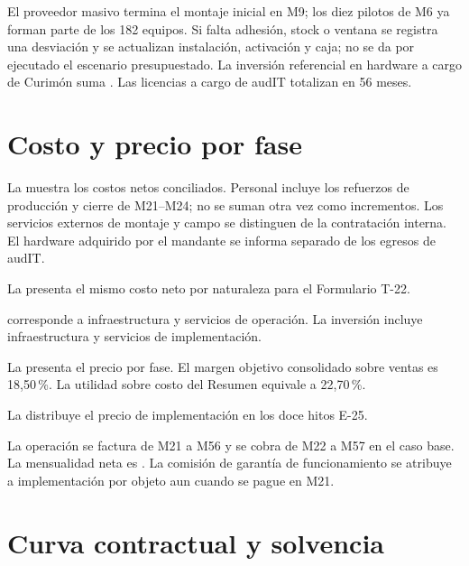 El proveedor masivo termina el montaje inicial en M9; los diez pilotos de M6 ya forman parte de
los 182 equipos. Si falta adhesión, stock o ventana se registra una desviación y se actualizan
instalación, activación y caja; no se da por ejecutado el escenario presupuestado.
La inversión referencial en hardware a cargo de Curimón suma .
Las licencias a cargo de audIT totalizan  en 56 meses.

\section{Costo y precio por fase}\label{sec:eco-costos}

La  muestra los costos netos conciliados. Personal incluye los refuerzos de
producción y cierre de M21--M24; no se suman otra vez como incrementos. Los servicios externos
de montaje y campo se distinguen de la contratación interna. El hardware adquirido por el
mandante se informa separado de los egresos de audIT.


La  presenta el mismo costo neto por naturaleza para el Formulario T-22.


 corresponde a infraestructura y servicios de operación. La
inversión incluye infraestructura y servicios de implementación.

La  presenta el precio por fase. El margen objetivo consolidado sobre ventas
es 18,50\,\%. La utilidad sobre costo del Resumen equivale a 22,70\,\%.


La  distribuye el precio de implementación en los doce hitos E-25.

\tablaHitosPago

La operación se factura de M21 a M56 y se cobra de M22 a M57 en el caso base.
La mensualidad neta es . La comisión de garantía
de funcionamiento se atribuye a implementación por objeto aun cuando se pague en M21.

\section{Curva contractual y solvencia}\label{sec:eco-curva-s}


